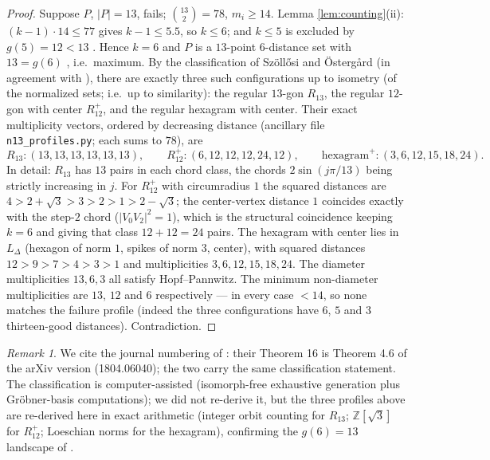 \documentclass[11pt]{article}
\theoremstyle{definition}
\theoremstyle{remark}
\newtheorem{remark}[theorem]{Remark}
\newcommand{\Z}{\mathbb{Z}}
\newcommand{\Lat}{L_{\Delta}}
\begin{document}
\begin{proof}
Suppose $P$, $|P| = 13$, fails; $\binom{13}{2} = 78$, $m_i \ge 14$. Lemma
\ref{lem:counting}(ii): $(k-1) \cdot 14 \le 77$ gives $k - 1 \le 5.5$, so $k \le 6$; and
$k \le 5$ is excluded by $g(5) = 12 < 13$ \cite{ErFi96}. Hence $k = 6$ and $P$ is a
$13$-point $6$-distance set with $13 = g(6)$ \cite{Wei12}, i.e.\ maximum. By the
classification of Sz\"oll\H{o}si and \"Osterg\aa rd \cite[Theorem~16]{SzOs20} (in
agreement with \cite{Wei12}), there are exactly three such configurations up to
isometry (of the normalized sets; i.e.\ up to similarity): the regular $13$-gon
$R_{13}$, the regular $12$-gon with center $R_{12}^+$, and the regular hexagram with
center. Their exact multiplicity vectors, ordered by decreasing distance (ancillary
file \texttt{n13\_profiles.py}; each sums to $78$), are
\[
R_{13} : (13, 13, 13, 13, 13, 13), \qquad
R_{12}^+ : (6, 12, 12, 12, 24, 12), \qquad
\text{hexagram}^+ : (3, 6, 12, 15, 18, 24).
\]
In detail: $R_{13}$ has $13$ pairs in each chord class, the chords
$2\sin(j\pi/13)$ being strictly increasing in $j$. For $R_{12}^+$ with circumradius
$1$ the squared distances are $4 > 2+\sqrt3 > 3 > 2 > 1 > 2-\sqrt3$; the center-vertex
distance $1$ coincides exactly with the step-$2$ chord ($|V_0V_2|^2 = 1$), which is the
structural coincidence keeping $k = 6$ and giving that class $12 + 12 = 24$ pairs. The
hexagram with center lies in $\Lat$ (hexagon of norm $1$, spikes of norm $3$, center),
with squared distances $12 > 9 > 7 > 4 > 3 > 1$ and multiplicities
$3, 6, 12, 15, 18, 24$. The diameter multiplicities $13, 6, 3$ all satisfy
Hopf--Pannwitz. The minimum non-diameter multiplicities are $13$, $12$ and $6$
respectively --- in every case $< 14$, so none matches the failure profile (indeed the
three configurations have $6$, $5$ and $3$ thirteen-good distances). Contradiction.
\end{proof}

\begin{remark}
We cite the journal numbering of \cite{SzOs20}: their Theorem 16 is Theorem 4.6 of the
arXiv version (1804.06040); the two carry the same classification statement.
The classification is computer-assisted (isomorph-free exhaustive generation plus
Gr\"obner-basis computations); we did not re-derive it, but the three profiles above
are re-derived here in exact arithmetic (integer orbit counting for $R_{13}$;
$\Z[\sqrt3]$ for $R_{12}^+$; Loeschian norms for the hexagram), confirming the
$g(6) = 13$ landscape of \cite{Wei12}.
\end{remark}
\end{document}
